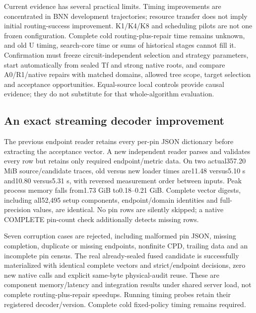\documentclass[conference,10pt]{IEEEtran}
\begin{document}
Current evidence has several practical limits. Timing improvements are concentrated in BNN development trajectories; resource transfer does not imply initial routing-success improvement. K1/K4/K8 and scheduling pilots are not one frozen configuration. Complete cold routing-plus-repair time remains unknown, and old U timing, search-core time or sums of historical stages cannot fill it. Confirmation must freeze circuit-independent selection and strategy parameters, start automatically from sealed Tf and strong native roots, and compare A0/R1/native repairs with matched domains, allowed tree scope, target selection and acceptance opportunities. Equal-source local controls provide causal evidence; they do not substitute for that whole-algorithm evaluation.

\subsection{An exact streaming decoder improvement}
The previous endpoint reader retains every per-pin JSON dictionary before extracting the acceptance vector. A new independent reader parses and validates every row but retains only required endpoint/metric data. On two actual357.20 MiB source/candidate traces, old versus new loader times are11.48 versus5.10 s and10.80 versus5.31 s, with reversed measurement order between inputs. Peak process memory falls from1.73 GiB to0.18--0.21 GiB. Complete vector digests, including all52,495 setup components, endpoint/domain identities and full-precision values, are identical. No pin rows are silently skipped; a native COMPLETE pin-count check additionally detects missing rows.

Seven corruption cases are rejected, including malformed pin JSON, missing completion, duplicate or missing endpoints, nonfinite CPD, trailing data and an incomplete pin census. The real already-sealed fused candidate is successfully materialized with identical complete vectors and strict/endpoint decisions, zero new native calls and explicit same-byte physical-audit reuse. These are component memory/latency and integration results under shared server load, not complete routing-plus-repair speedups. Running timing probes retain their registered decoder/version. Complete cold fixed-policy timing remains required.
\end{document}
